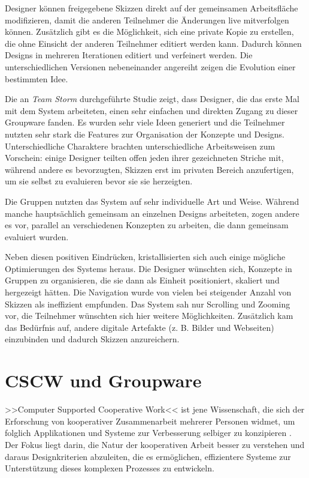 Designer können freigegebene Skizzen direkt auf der gemeinsamen Arbeitsfläche modifizieren, damit die anderen Teilnehmer die Änderungen live mitverfolgen können. Zusätzlich gibt es die Möglichkeit, sich eine private Kopie zu erstellen, die ohne Einsicht der anderen Teilnehmer editiert werden kann. Dadurch können Designs in mehreren Iterationen editiert und verfeinert werden. Die unterschiedlichen Versionen nebeneinander angereiht zeigen die Evolution einer bestimmten Idee.

Die an \emph{Team Storm} durchgeführte Studie \citep{Hailpern:2007p113} zeigt, dass Designer, die das erste Mal mit dem System arbeiteten, einen sehr einfachen und direkten Zugang zu dieser Groupware fanden. Es wurden sehr viele Ideen generiert und die Teilnehmer nutzten sehr stark die Features zur Organisation der Konzepte und Designs. Unterschiedliche Charaktere brachten unterschiedliche Arbeitsweisen zum Vorschein: einige Designer teilten offen jeden ihrer gezeichneten Striche mit, während andere es bevorzugten, Skizzen erst im privaten Bereich anzufertigen, um sie selbst zu evaluieren bevor sie sie herzeigten.

Die Gruppen nutzten das System auf sehr individuelle Art und Weise. Während manche hauptsächlich gemeinsam an einzelnen Designs arbeiteten, zogen andere es vor, parallel an verschiedenen Konzepten zu arbeiten, die dann gemeinsam evaluiert wurden.

Neben diesen positiven Eindrücken, kristallisierten sich auch einige mögliche Optimierungen des Systems heraus. Die Designer wünschten sich, Konzepte in Gruppen zu organisieren, die sie dann als Einheit positioniert, skaliert und hergezeigt hätten. Die Navigation wurde von vielen bei steigender Anzahl von Skizzen als ineffizient empfunden. Das System sah nur Scrolling und Zooming vor, die Teilnehmer wünschten sich hier weitere Möglichkeiten. Zusätzlich kam das Bedürfnis auf, andere digitale Artefakte (z. B. Bilder und Webseiten) einzubinden und dadurch Skizzen anzureichern.

\section{CSCW und Groupware}
>>Computer Supported Cooperative Work<< ist jene Wissenschaft, die sich der Erforschung von kooperativer Zusammenarbeit mehrerer Personen widmet, um folglich Applikationen und Systeme zur Verbesserung selbiger zu konzipieren \citep{Bannon:1990p244}. Der Fokus liegt darin, die Natur der kooperativen Arbeit besser zu verstehen und daraus Designkriterien abzuleiten, die es ermöglichen, effizientere Systeme zur Unterstützung dieses komplexen Prozesses zu entwickeln. 

